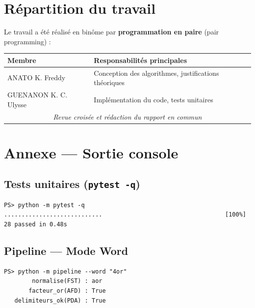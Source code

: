 \documentclass[12pt,a4paper,oneside]{scrartcl}
\begin{document}
\section{Répartition du travail}

Le travail a été réalisé en binôme par \textbf{programmation en paire} (pair programming) :

\begin{center}
\begin{tabular}{ll}
    \toprule
    \textbf{Membre} & \textbf{Responsabilités principales} \\
    \midrule
    ANATO K. Freddy & Conception des algorithmes, justifications théoriques \\
    GUENANON K. C. Ulysse & Implémentation du code, tests unitaires \\
    \midrule
    \multicolumn{2}{c}{\textit{Revue croisée et rédaction du rapport en commun}} \\
    \bottomrule
\end{tabular}
\end{center}

\newpage

\section*{Annexe — Sortie console}

\subsection*{Tests unitaires (\texttt{pytest -q})}

\begin{lstlisting}
PS> python -m pytest -q
............................                                   [100%]
28 passed in 0.48s
\end{lstlisting}

\subsection*{Pipeline — Mode Word}

\begin{lstlisting}
PS> python -m pipeline --word "4or"
        normalise(FST) : aor
       facteur_or(AFD) : True
   delimiteurs_ok(PDA) : True
\end{lstlisting}
\end{document}
